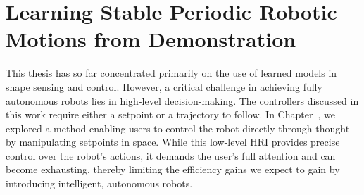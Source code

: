 \chapter{Learning Stable Periodic Robotic Motions from Demonstration}
\label{chp:osmp}

\begin{foreword}
    This thesis has so far concentrated primarily on the use of learned models in shape sensing and control. However, a critical challenge in achieving fully autonomous robots lies in high-level decision-making. The controllers discussed in this work require either a setpoint or a trajectory to follow. In Chapter~\circled{\ref{chp:braincontrol}}, we explored a method enabling users to control the robot directly through thought by manipulating setpoints in space. While this low-level \gls{HRI} provides precise control over the robot’s actions, it demands the user’s full attention and can become exhausting, thereby limiting the efficiency gains we expect to gain by introducing intelligent, autonomous robots.

\end{foreword}
